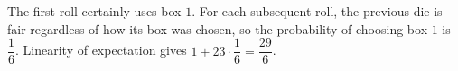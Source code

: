 The first roll certainly uses box $1$. For each subsequent roll, the previous die is fair regardless of how its box was chosen, so the probability of choosing box $1$ is $\dfrac{1}{6}$. Linearity of expectation gives $1+23\cdot\dfrac{1}{6}=\boxed{\dfrac{29}{6}}$.

